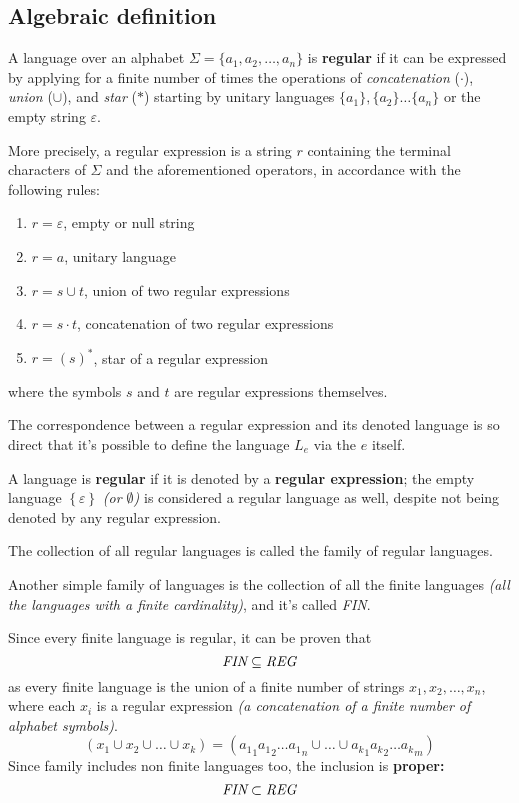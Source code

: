 \documentclass[english]{article}
\begin{document}
\subsection{Algebraic definition}

A language over an alphabet \(\Sigma = \{a_1, a_2, \ldots, a_n\}\) is \textbf{regular} if it can be expressed by applying for a finite number of times the operations of \textit{concatenation} (\(\cdot\)), \textit{union} (\(\cup\)), and \textit{star} (\(\ast\)) starting by unitary languages \(\{a_1\}, \{a_2\} \ldots \{a_n\}\) or the empty string \(\varepsilon\).

More precisely, a regular expression is a string \(r\) containing the terminal characters of \(\Sigma\) and the aforementioned operators, in accordance with the following rules:

\begin{enumerate}
  \item \(r = \varepsilon\), empty or null string
  \item \(r = a\), unitary language
  \item \(r = s \cup t\), union of two regular expressions
  \item \(r = s \cdot t\), concatenation of two regular expressions
  \item \(r = (s)^\ast\), star of a regular expression
\end{enumerate}

where the symbols \(s\) and \(t\) are regular expressions themselves.

\bigskip
The correspondence between a regular expression and its denoted language is so direct that it's possible to define the language \(L_e\) via the \re \(e\) itself.

A language is \textbf{regular} if it is denoted by a \textbf{regular expression};
the empty language \(\left\{ \varepsilon \right\}\) \textit{(or \(\emptyset\))} is considered a regular language as well, despite not being denoted by any regular expression.

The collection of all regular languages is called the family \REG of regular languages.

Another simple family of languages is the collection of all the finite languages \textit{(all the languages with a finite cardinality)}, and it's called \textit{FIN}.

Since every finite language is regular, it can be proven that
\[ \textit{FIN} \subseteq \textit{REG} \]
as every finite language is the union of a finite number of strings \(x_1, x_2, \ldots, x_n\), where each \(x_i\) is a regular expression \textit{(a concatenation of a finite number of alphabet symbols)}.
\[ \left(x_1 \cup x_2 \cup \ldots \cup x_k \right) = \left({a_1}_1 {a_1}_2 \ldots {a_1}_n \cup \ldots \cup {a_k}_1 {a_k}_2 \ldots {a_k}_m \right) \]
Since family \REG includes non finite languages too, the inclusion is \textbf{proper:}
\[ \textit{FIN} \subset \textit{REG} \]
\end{document}
